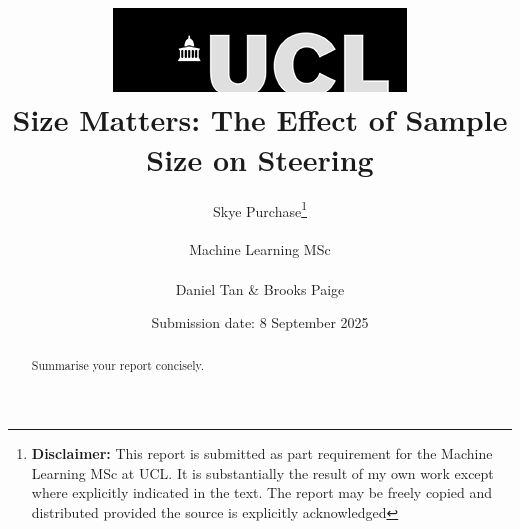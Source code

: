 \documentclass[tikz, ]{report}
\title{{ \includegraphics[scale=.5]{figures/ucl_logo.png}}\\
{{\Huge Size Matters: The Effect of Sample Size on Steering}}\\
}
\date{Submission date: 8 September 2025}
\author{Skye Purchase\thanks{
{\bf Disclaimer:}
This report is submitted as part requirement for the Machine Learning MSc at UCL. It is
substantially the result of my own work except where explicitly indicated in the text.
The report may be freely copied and distributed provided the source is explicitly acknowledged}
\\ \\
Machine Learning MSc\\ \\
Daniel Tan \& Brooks Paige}
\begin{document}
\linenumbers





\onehalfspacing
\maketitle
\begin{abstract}
Summarise your report concisely.
\end{abstract}

\tableofcontents
\listoffigures
\listoftables
\clearpage
{}









\appendix




\end{document}
